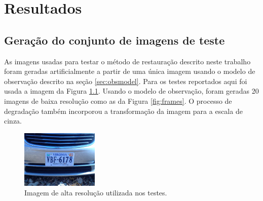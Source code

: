 \chapter{Resultados}
\section{Geração do conjunto de imagens de teste}
As imagens usadas para testar o método de restauração descrito neste trabalho foram geradas artificialmente a partir de uma única imagem usando o modelo de observação descrito na seção \ref{sec:obsmodel}.
Para os testes reportados aqui foi usada a imagem da Figura \ref{fig:hrimage}.
Usando o modelo de observação, foram geradas 20 imagens de baixa resolução como as da Figura \ref{fig:frames}.
O processo de degradação também incorporou a transformação da imagem para a escala de cinza.

\begin{figure}[h]
	\centering
	\includegraphics{figures/imtestes.png}
	\caption{Imagem de alta resolução utilizada nos testes.}
	\label{fig:hrimage}

\end{figure}

